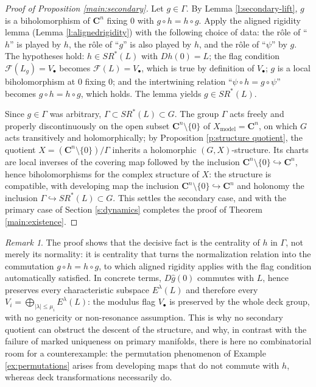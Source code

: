 \documentclass[english,11pt]{amsart}
\theoremstyle{definition}
\theoremstyle{remark}
\newtheorem{remark}[theorem]{Remark}
\numberwithin{equation}{section}
\newcommand{\C}{\mathbf{C}}
\newcommand{\FF}{\mathcal{F}}
\begin{document}
\begin{proof}[Proof of Proposition \ref{main:secondary}]
Let $g\in\Gamma$. By Lemma \ref{l:secondary-lift}, $g$ is a biholomorphism of $\C^n$ fixing $0$ with $g\circ h=h\circ g$. Apply the aligned rigidity lemma (Lemma \ref{l:alignedrigidity}) with the following choice of data: the r\^ole of ``$h$'' is played by $h$, the r\^ole of ``$g$'' is also played by $h$, and the r\^ole of ``$\psi$'' by $g$. The hypotheses hold: $h\in SR^*(L)$ with $Dh(0)=L$; the flag condition $\FF(L_g)=V_\bullet$ becomes $\FF(L)=V_\bullet$, which is true by definition of $V_\bullet$; $g$ is a local biholomorphism at $0$ fixing $0$; and the intertwining relation ``$\psi\circ h=g\circ\psi$'' becomes $g\circ h=h\circ g$, which holds. The lemma yields $g\in SR^*(L)$.

Since $g\in\Gamma$ was arbitrary, $\Gamma\subset SR^*(L)\subset G$. The group $\Gamma$ acts freely and properly discontinuously on the open subset $\C^n\setminus\{0\}$ of $X_{\mathrm{model}}=\C^n$, on which $G$ acts transitively and holomorphically; by Proposition \ref{p:structure quotient}, the quotient $X=(\C^n\setminus\{0\})/\Gamma$ inherits a holomorphic $(G,X)$-structure. Its charts are local inverses of the covering map followed by the inclusion $\C^n\setminus\{0\}\hookrightarrow\C^n$, hence biholomorphisms for the complex structure of $X$: the structure is compatible, with developing map the inclusion $\C^n\setminus\{0\}\hookrightarrow\C^n$ and holonomy the inclusion $\Gamma\hookrightarrow SR^*(L)\subset G$. This settles the secondary case, and with the primary case of Section \ref{s:dynamics} completes the proof of Theorem \ref{main:existence}.
\end{proof}

\begin{remark}
The proof shows that the decisive fact is the centrality of $h$ in $\Gamma$, not merely its normality: it is centrality that turns the normalization relation into the commutation $g\circ h=h\circ g$, to which aligned rigidity applies with the flag condition automatically satisfied. In concrete terms, $D\widehat g(0)$ commutes with $L$, hence preserves every characteristic subspace $E^\lambda(L)$ and therefore every $V_i=\bigoplus_{|\lambda|\le\mu_i}E^\lambda(L)$: the modulus flag $V_\bullet$ is preserved by the whole deck group, with no genericity or non-resonance assumption. This is why no secondary quotient can obstruct the descent of the structure, and why, in contrast with the failure of marked uniqueness on primary manifolds, there is here no combinatorial room for a counterexample: the permutation phenomenon of Example \ref{ex:permutations} arises from developing maps that do not commute with $h$, whereas deck transformations necessarily do.
\end{remark}
\end{document}
